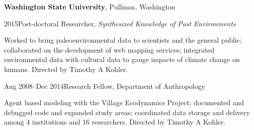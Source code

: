{\bf Washington State University}, Pullman, Washington
\begin{list1}
\item[] 2015\hspace{.2cm}Post-doctoral Researcher, \emph{Synthesized Knowledge of Past Environments}
\begin{list2}
\item[] Worked to bring paleoenvironmental data to scientists and the general public; collaborated on the development of web mapping services; integrated environmental data with cultural data to gauge impacts of climate change on humans. Directed by Timothy A Kohler.
\end{list2}

\vspace{0.1in}

\item[] Aug 2008–Dec 2014\hspace{.2cm}Research Fellow, Department of Anthropology
\begin{list2}
\item[] Agent based modeling with the Village Ecodynamics Project; documented and debugged code and expanded study areas; coordinated data storage and delivery among 4 institutions and 16 researchers. Directed by Timothy A Kohler.
\end{list2}


\end{list1}
